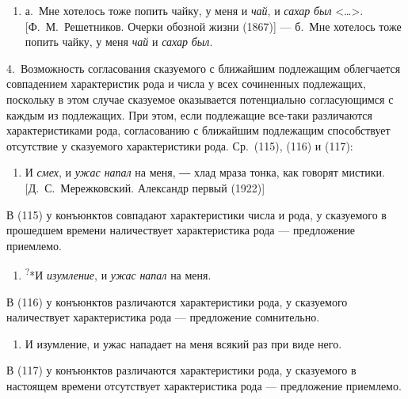 \begin{enumerate}
\def\labelenumi{(\arabic{enumi})}
\setcounter{enumi}{113}
\item
  а.~Мне хотелось тоже попить чайку, у меня и \textit{чай}, и \textit{сахар}
  \textit{был} \textless\ldots\textgreater. {[}Ф.~М.~Решетников. Очерки
  обозной жизни (1867){]} --- б.~Мне хотелось тоже попить чайку, у меня
  \textit{чай} и \textit{сахар} \textit{был}.
\end{enumerate}

4.~Возможность согласования сказуемого с ближайшим подлежащим
облегчается совпадением характеристик рода и числа у всех сочиненных
подлежащих, поскольку в этом случае сказуемое оказывается потенциально
согласующимся с каждым из подлежащих. При этом, если подлежащие все-таки
различаются характеристиками рода, согласованию с ближайшим подлежащим
способствует отсутствие у сказуемого характеристики рода. Ср.~(115),
(116) и (117):

\begin{enumerate}
\def\labelenumi{(\arabic{enumi})}
\setcounter{enumi}{114}
\item
  И \textit{смех}, и \textit{ужас напал} на меня, ― хлад мраза тонка, как
  говорят мистики. {[}Д.~С.~Мережковский. Александр первый (1922){]}
\end{enumerate}

В (115) у конъюнктов совпадают характеристики числа и рода, у сказуемого
в прошедшем времени наличествует характеристика рода --- предложение
приемлемо.

\begin{enumerate}
\def\labelenumi{(\arabic{enumi})}
\setcounter{enumi}{115}
\item
  \textsuperscript{?}*И \textit{изумление}, и \textit{ужас} \textit{напал} на
  меня.
\end{enumerate}

В (116) у конъюнктов различаются характеристики рода, у сказуемого
наличествует характеристика рода --- предложение сомнительно.

\begin{enumerate}
\def\labelenumi{(\arabic{enumi})}
\setcounter{enumi}{116}
\item
  И изумление, и ужас нападает на меня всякий раз при виде него.
\end{enumerate}

В (117) у конъюнктов различаются характеристики рода, у сказуемого в
настоящем времени отсутствует характеристика рода --- предложение
приемлемо.

